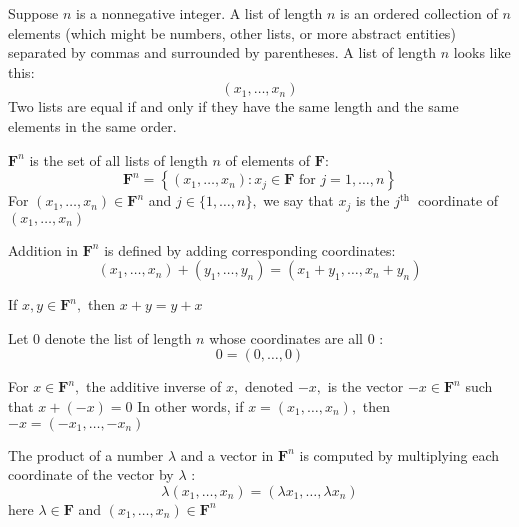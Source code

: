 Suppose $n$ is a nonnegative integer. A list of length $n$ is an ordered collection of $n$ elements (which might be numbers, other lists, or more abstract entities) separated by commas and surrounded by parentheses. A list of length $n$ looks like this:
$$
\left(x_{1}, \ldots, x_{n}\right)
$$
Two lists are equal if and only if they have the same length and the same elements in the same order.

$\mathbf{F}^{n}$ is the set of all lists of length $n$ of elements of $\mathbf{F}:$
$$
\mathbf{F}^{n}=\left\{\left(x_{1}, \ldots, x_{n}\right): x_{j} \in \mathbf{F} \text { for } j=1, \ldots, n\right\}
$$
For $\left(x_{1}, \ldots, x_{n}\right) \in \mathbf{F}^{n}$ and $j \in\{1, \ldots, n\},$ we say that $x_{j}$ is the $j^{\text {th }}$ coordinate of $\left(x_{1}, \dots, x_{n}\right)$

Addition in $\mathbf{F}^{n}$ is defined by adding corresponding coordinates:
$$
\left(x_{1}, \ldots, x_{n}\right)+\left(y_{1}, \ldots, y_{n}\right)=\left(x_{1}+y_{1}, \ldots, x_{n}+y_{n}\right)
$$

If $x, y \in \mathbf{F}^{n},$ then $x+y=y+x$

Let 0 denote the list of length $n$ whose coordinates are all 0 :
$$
0=(0, \ldots, 0)
$$

For $x \in \mathbf{F}^{n},$ the additive inverse of $x,$ denoted $-x,$ is the vector $-x \in \mathbf{F}^{n}$ such that $x+(-x)=0$
In other words, if $x=\left(x_{1}, \ldots, x_{n}\right),$ then $-x=\left(-x_{1}, \ldots,-x_{n}\right)$

The product of a number $\lambda$ and a vector in $\mathbf{F}^{n}$ is computed by multiplying each coordinate of the vector by $\lambda$ :
$$
\lambda\left(x_{1}, \ldots, x_{n}\right)=\left(\lambda x_{1}, \ldots, \lambda x_{n}\right)
$$
here $\lambda \in \mathbf{F}$ and $\left(x_{1}, \ldots, x_{n}\right) \in \mathbf{F}^{n}$
